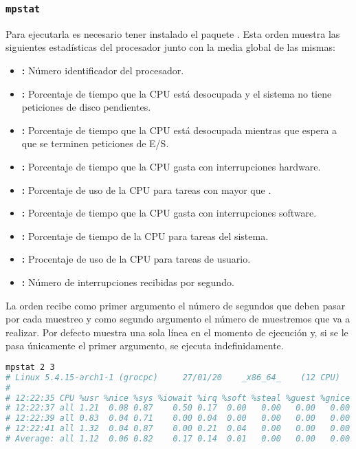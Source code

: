 \subsubsection{\texttt{mpstat}}

Para ejecutarla es necesario tener instalado el paquete .
Esta orden muestra las siguientes estadísticas del procesador junto con la media global de las mismas:

\begin{itemize}
	\item{}\textbf{:} Número identificador del procesador.
	\item{}\textbf{:} Porcentaje de tiempo que la CPU está desocupada y el sistema no tiene peticiones de disco pendientes.
	\item{}\textbf{:} Porcentaje de tiempo que la CPU está desocupada mientras que espera a que se terminen peticiones de E/S.
	\item{}\textbf{:} Porcentaje de tiempo que la CPU gasta con interrupciones hardware.
	\item{}\textbf{:} Porcentaje de uso de la CPU para tareas con  mayor que .
	\item{}\textbf{:} Porcentaje de tiempo que la CPU gasta con interrupciones software.
	\item{}\textbf{:} Porcentaje de tiempo de la CPU para tareas del sistema.
	\item{}\textbf{:} Procentaje de uso de la CPU para tareas de usuario.
	\item{}\textbf{:} Número de interrupciones recibidas por segundo.
\end{itemize}

La orden recibe como primer argumento el número de segundos que deben pasar por cada muestreo y como segundo argumento el número de muestremos que va a realizar.
Por defecto muestra una sola línea en el momento de ejecución y, si se le pasa únicamente el primer argumento, se ejecuta indefinidamente.

\begin{lstlisting}[language=Bash]
mpstat 2 3
# Linux 5.4.15-arch1-1 (grocpc) 	27/01/20 	_x86_64_	(12 CPU)
#
# 12:22:35 CPU %usr %nice %sys %iowait %irq %soft %steal %guest %gnice %idle
# 12:22:37 all 1.21  0.08 0.87    0.50 0.17  0.00   0.00   0.00   0.00 97.17
# 12:22:39 all 0.83  0.04 0.71    0.00 0.04  0.00   0.00   0.00   0.00 98.38
# 12:22:41 all 1.32  0.04 0.87    0.00 0.21  0.04   0.00   0.00   0.00 97.52
# Average: all 1.12  0.06 0.82    0.17 0.14  0.01   0.00   0.00   0.00 97.69
\end{lstlisting}


